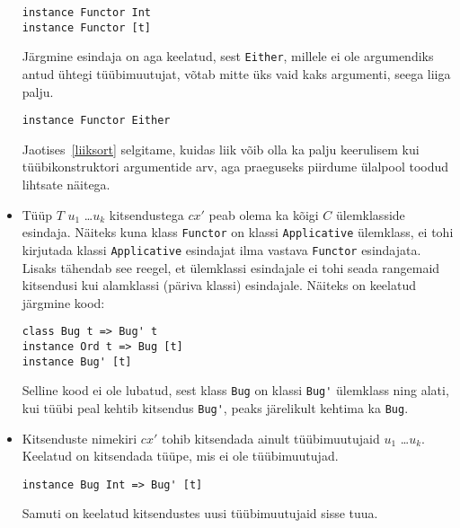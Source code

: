 \documentclass[12pt]{article}
\begin{document}
\begin{itemize}
            \begin{verbatim}instance Functor Int
instance Functor [t]\end{verbatim}

            Järgmine esindaja on aga keelatud, sest \verb!Either!, millele ei ole argumendiks antud ühtegi tüübimuutujat, võtab mitte üks vaid kaks argumenti, seega liiga palju.

            \begin{verbatim}instance Functor Either\end{verbatim}

            Jaotises~\ref{liiksort} selgitame, kuidas liik võib olla ka palju keerulisem kui tüübikonstruktori argumentide arv, aga praeguseks piirdume ülalpool toodud lihtsate näitega.
          \item
            Tüüp $T$ $u_1$ \ldots $u_k$ kitsendustega $cx'$ peab olema ka kõigi $C$ ülemklasside esindaja. Näiteks kuna klass \verb!Functor! on klassi \verb!Applicative! ülemklass, ei tohi kirjutada klassi \verb!Applicative! esindajat ilma vastava \verb!Functor! esindajata. Lisaks tähendab see reegel, et ülemklassi esindajale ei tohi seada rangemaid kitsendusi kui alamklassi (päriva klassi) esindajale. Näiteks on keelatud järgmine kood:

            \begin{verbatim}class Bug t => Bug' t
instance Ord t => Bug [t]
instance Bug' [t]\end{verbatim}

            Selline kood ei ole lubatud, sest klass \verb!Bug! on klassi \verb!Bug'! ülemklass ning alati, kui tüübi peal kehtib kitsendus \verb!Bug'!, peaks järelikult kehtima ka \verb!Bug!.
          \item
            Kitsenduste nimekiri $cx'$ tohib kitsendada ainult tüübimuutujaid $u_1$ \ldots $u_k$. Keelatud on kitsendada tüüpe, mis ei ole tüübimuutujad.

            \begin{verbatim}instance Bug Int => Bug' [t]\end{verbatim}

            Samuti on keelatud kitsendustes uusi tüübimuutujaid sisse tuua.


\end{itemize}
\end{document}
